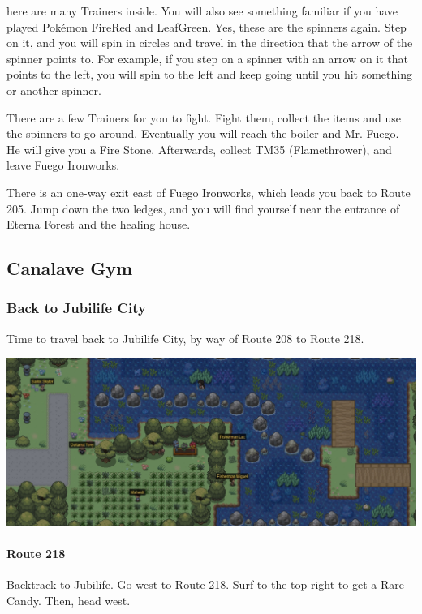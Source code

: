 \documentclass[11pt]{article}
\begin{document}
here are many Trainers inside.
You will also see something familiar if you have played
Pokémon FireRed and LeafGreen.
Yes, these are the spinners again.
Step on it, and you will spin in circles and travel in the direction
that the arrow of the spinner points to.
For example, if you step on a spinner with an arrow on it that points to the left,
you will spin to the left and keep going until you hit something or another spinner.

There are a few Trainers for you to fight.
Fight them, collect the items and use the spinners to go around.
Eventually you will reach the boiler and Mr. Fuego.
He will give you a Fire Stone.
Afterwards, collect TM35 (Flamethrower), and leave Fuego Ironworks.

There is an one-way exit east of Fuego Ironworks, which leads you back to Route 205.
Jump down the two ledges, and you will find yourself near the entrance of
Eterna Forest and the healing house.






\subsection{Canalave Gym}\label{subsec:canalave-gym}

\subsubsection{Back to Jubilife City}\label{subsubsec:back-to-jubilife-city}
Time to travel back to Jubilife City, by way of Route 208 to Route 218.

\includegraphics[width=\textwidth]{walkthrough/Sinnoh/Route_218}

\paragraph{Route 218}
Backtrack to Jubilife.
Go west to Route 218.
Surf to the top right to get a Rare Candy.
Then, head west.
\end{document}
